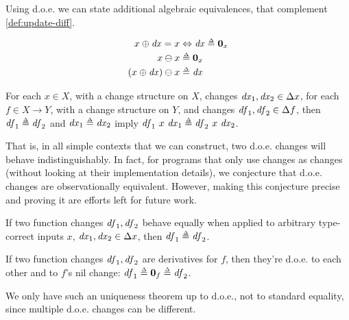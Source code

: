 \begin{lemma}
  Using d.o.e. we can state additional algebraic equivalences,
  that complement \cref{def:update-diff}.

\begin{align*}
\Update x \D{x} = x &\Leftrightarrow \D{x} \Doe \NilC{x}\\
\Diff x x &\Doe \NilC {x}\\
\Diff {\Update*{x}{\D{x}}} x &\Doe \D{x}
\end{align*}
\end{lemma}

\begin{lemma}
  For each $x \in X$, with a change structure on $X$, changes
  $\D{x}_1, \D{x}_2 \in \Change{x}$, for each $f \in X \to Y$,
with a change structure on $Y$, and changes
$\D{f}_1, \D{f}_2 \in \Change{f}$, then $\D{f}_1 \Doe \D{f}_2$ and
$\D{x}_1 \Doe \D{x}_2$ imply
$\D{f}_1~x~\D{x}_1 \Doe \D{f}_2~x~\D{x}_2$.
\end{lemma}

That is, in all simple contexts that we can construct, two d.o.e.
changes will behave indistinguishably. In fact, for programs that
only use changes as changes (without looking at their
implementation details), we conjecture that d.o.e. changes are
observationally equivalent. However, making this conjecture
precise and proving it are efforts left for future work.

\begin{lemma}
  If two function changes $\mathit{df}_1, \mathit{df}_2$ behave equally when
  applied to arbitrary type-correct inputs $x$,
  $\D{x}_1, \D{x}_2 \in \Change{x}$, then $\D{f}_1 \Doe \D{f}_2$.
\end{lemma}

\begin{lemma}
  If two function changes $\mathit{df}_1, \mathit{df}_2$ are derivatives for
  $f$, then they're d.o.e. to each other and to $f$'s nil change:
  $\D{f}_1 \Doe \NilC{f} \Doe \D{f}_2$.
\end{lemma}
We only have such an uniqueness theorem up to d.o.e., not to
standard equality, since multiple d.o.e. changes can be
different.
